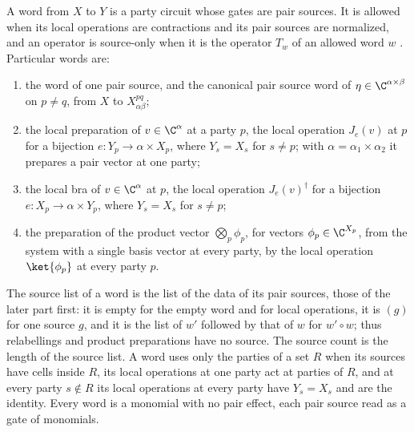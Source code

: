 \begin{definition}
    \label{def:party_word}
    \leanok
    A word from $X$ to $Y$ is a party circuit whose gates are pair sources. It is
    allowed when its local operations are contractions and its pair sources are
    normalized, and an operator is source-only when it is the operator $T_w$ of an
    allowed word $w$ \cite[Lemma~5.1]{OpenAI2026PolynomialPEPS}. Particular words are:
    \begin{enumerate}
        \item the word of one pair source, and the canonical pair source word of
              $\eta\in\C^{\alpha\times\beta}$ on $p\neq q$, from $X$ to
              $X^{pq}_{\alpha\beta}$;
        \item the local preparation of $v\in\C^\alpha$ at a party $p$, the local
              operation $J_e(v)$ at $p$ for a bijection
              $e\colon Y_p\to\alpha\times X_p$, where $Y_s=X_s$ for $s\neq p$; with
              $\alpha=\alpha_1\times\alpha_2$ it prepares a pair vector at one party;
        \item the local bra of $v\in\C^\alpha$ at $p$, the local operation
              $J_e(v)^\dagger$ for a bijection $e\colon X_p\to\alpha\times Y_p$,
              where $Y_s=X_s$ for $s\neq p$;
        \item the preparation of the product vector $\bigotimes_p\phi_p$, for vectors
              $\phi_p\in\C^{X_p}$, from the system with a single basis vector at every
              party, by the local operation $\ket{\phi_p}$ at every party $p$.
    \end{enumerate}
    The source list of a word is the list of the data of its pair sources, those of the
    later part first: it is empty for the empty word and for local operations, it is
    $(g)$ for one source $g$, and it is the list of $w'$ followed by that of $w$ for
    $w'\circ w$; thus relabellings and product preparations have no source. The source
    count is the length of the source list. A word uses only the parties of a set $R$
    when its sources have cells inside $R$, its local operations at one party act at
    parties of $R$, and at every party $s\notin R$ its local operations at every party
    have $Y_s=X_s$ and are the identity. Every word is a monomial with no pair effect,
    each pair source read as a gate of monomials.
\end{definition}

